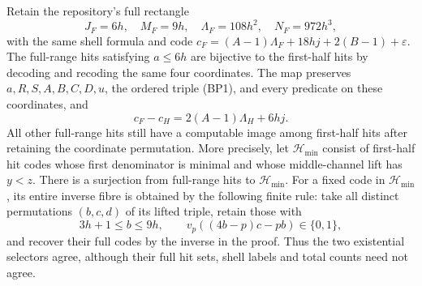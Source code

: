 \begin{proposition}
\label{prop:bp-radix}
Retain the repository's full rectangle
\[
 J_F=6h,\quad M_F=9h,\quad\Lambda_F=108h^2,
 \quad N_F=972h^3,
\]
with the same shell formula and code
\(c_F=(A-1)\Lambda_F+18hj+2(B-1)+\varepsilon\).
The full-range hits satisfying \(a\le6h\) are bijective to the
first-half hits by decoding and recoding the same four coordinates.
The map preserves \(a,R,S,A,B,C,D,u\), the ordered triple (BP1),
and every predicate on these coordinates, and
\[
 c_F-c_H=2(A-1)\Lambda_H+6hj.
 \tag{BP4}
\]
All other full-range hits still have a computable image among
first-half hits after retaining the coordinate permutation. More
precisely, let \(\mathcal H_{\min}\) consist of first-half hit codes
whose first denominator is minimal and whose middle-channel lift has
\(y<z\). There is a surjection from full-range hits to
\(\mathcal H_{\min}\). For a fixed code in \(\mathcal H_{\min}\),
its entire inverse fibre is obtained by the following finite rule:
take all distinct permutations \((b,c,d)\) of its lifted triple,
retain those with
\[
 3h+1\le b\le9h,\qquad
 v_p((4b-p)c-pb)\in\{0,1\},
 \tag{BP5}
\]
and recover their full codes by the inverse in the proof.
Thus the two existential selectors agree, although their full hit
sets, shell labels and total counts need not agree.
\end{proposition}

